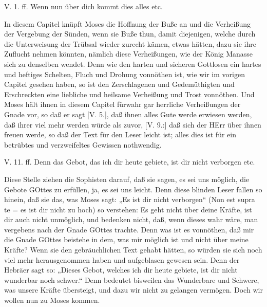 \begin{schriftzitat}
V. 1. ff. Wenn nun über dich kommt dies alles etc.
\end{schriftzitat}

In diesem Capitel knüpft Moses die Hoffnung der Buße an und die Verheißung der Vergebung der Sünden, wenn sie Buße thun, damit diejenigen, welche durch die Unterweisung der Trübsal wieder zurecht kämen, etwas hätten, dazu sie ihre Zuflucht nehmen könnten, nämlich diese Verheißungen, wie der König Manasse sich zu denselben wendet. Denn wie den harten und sicheren Gottlosen ein hartes und heftiges Schelten, Fluch und Drohung vonnöthen ist, wie wir im vorigen Capitel gesehen haben, so ist den Zerschlagenen und Gedemüthigten und Erschreckten eine liebliche und heilsame Verheißung und Trost vonnöthen. Und Moses hält ihnen in diesem Capitel fürwahr gar herrliche Verheißungen der Gnade vor, so daß er sagt [V. 5.], daß ihnen alles Gute werde erwiesen werden, daß ihrer viel mehr werden würde als zuvor, [V. 9.:] daß sich der HErr über ihnen freuen werde, so daß der Text für den Leser leicht ist; alles dies ist für ein betrübtes und verzweifeltes Gewissen nothwendig.

\begin{schriftzitat}
V. 11. ff. Denn das Gebot, das ich dir heute gebiete, ist dir nicht verborgen etc.
\end{schriftzitat}

Diese Stelle ziehen die Sophisten darauf, daß sie sagen, es sei uns möglich, die Gebote GOttes zu erfüllen, ja, es sei uns leicht. Denn diese blinden Leser fallen so hinein, daß sie das, was Moses sagt: „Es ist dir nicht verborgen“ (Non est supra te = es ist dir nicht zu hoch) so verstehen: Es geht nicht über deine Kräfte, ist dir auch nicht unmöglich, und bedenken nicht, daß, wenn dieses wahr wäre, man vergebens nach der Gnade GOttes trachte. Denn was ist es vonnöthen, daß mir die Gnade GOttes beistehe in dem, was mir möglich ist und nicht über meine Kräfte? Wenn sie den gebräuchlichen Text gehabt hätten, so würden sie sich noch viel mehr herausgenommen haben und aufgeblasen gewesen sein. Denn der Hebräer sagt so: „Dieses Gebot, welches ich dir heute gebiete, ist dir nicht wunderbar
noch schwer.“ Denn  bedeutet bisweilen das Wunderbare und Schwere, was unsere Kräfte übersteigt, und dazu wir nicht zu gelangen vermögen. Doch wir wollen nun zu Moses kommen.

